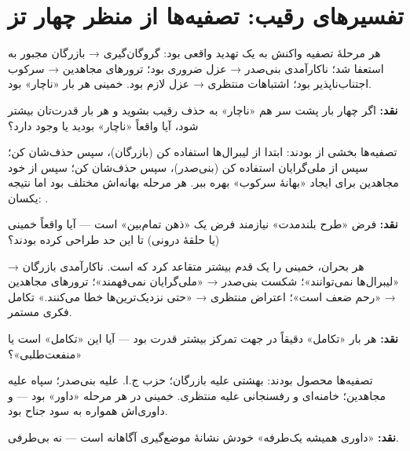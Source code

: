\section{تفسیرهای رقیب: تصفیه‌ها از منظر چهار تز}

\begin{principleBox}
\begin{description}[style=nextline, font=\bfseries\color{cPrimary}]
    \item[تز ۱ (صداقت + اجبار)]
    هر مرحلهٔ تصفیه واکنش به یک تهدید واقعی بود: گروگان‌گیری → بازرگان مجبور به استعفا شد؛ ناکارآمدی بنی‌صدر → عزل ضروری بود؛ ترورهای مجاهدین → سرکوب اجتناب‌ناپذیر بود؛ اشتباهات منتظری → عزل لازم بود. خمینی هر بار «ناچار» بود.

    \textbf{نقد:} اگر چهار بار پشت سر هم «ناچار» به حذف رقیب بشوید و هر بار قدرت‌تان بیشتر شود، آیا واقعاً «ناچار» بودید یا  وجود دارد؟

    \item[تز ۲ (خدعه)]
    تصفیه‌ها بخشی از  بودند: ابتدا از لیبرال‌ها استفاده کن (بازرگان)، سپس حذف‌شان کن؛ سپس از ملی‌گرایان استفاده کن (بنی‌صدر)، سپس حذف‌شان کن؛ سپس از خود مجاهدین برای ایجاد «بهانهٔ سرکوب» بهره ببر. هر مرحله بهانه‌اش مختلف بود اما نتیجه یکسان: .

    \textbf{نقد:} فرض «طرح بلندمدت» نیازمند فرض یک «ذهن تمام‌بین» است — آیا واقعاً خمینی (یا حلقهٔ درونی) تا این حد طراحی کرده بودند؟

    \item[تز ۳ (تکامل)]
    هر بحران، خمینی را یک قدم بیشتر متقاعد کرد که  است. ناکارآمدی بازرگان → «لیبرال‌ها نمی‌توانند»؛ شکست بنی‌صدر → «ملی‌گرایان نمی‌فهمند»؛ ترورهای مجاهدین → «رحم ضعف است»؛ اعتراض منتظری → «حتی نزدیک‌ترین‌ها خطا می‌کنند.» تکامل فکری مستمر.

    \textbf{نقد:} هر بار «تکامل» دقیقاً در جهت تمرکز بیشتر قدرت بود — آیا این «تکامل» است یا «منفعت‌طلبی»؟

    \item[تز ۴ (فشار نخبگان)]
    تصفیه‌ها محصول  بودند: بهشتی علیه بازرگان؛ حزب ج.ا. علیه بنی‌صدر؛ سپاه علیه مجاهدین؛ خامنه‌ای و رفسنجانی علیه منتظری. خمینی در هر مرحله «داور» بود — و داوری‌اش همواره به سود جناح  بود.

    \textbf{نقد:} «داوری همیشه یک‌طرفه» خودش نشانهٔ موضع‌گیری آگاهانه است — نه بی‌طرفی.
\end{description}
\end{principleBox}

